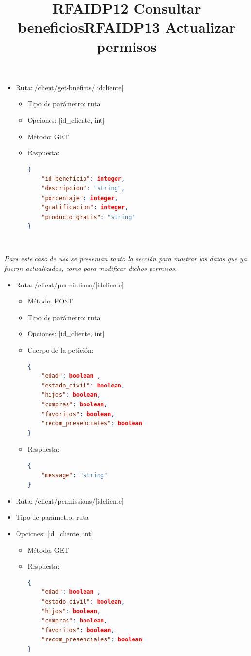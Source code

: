 \title{\textbf{RFAIDP12 Consultar beneficios}}
\begin{itemize}
\item Ruta: /client/get-bneficts/[idcliente]
\begin{itemize}
\item Tipo de parámetro: ruta
\item Opciones: [id\_cliente, int]
\item Método: GET
\item Respuesta:
\begin{lstlisting}[language=json,firstnumber=1]
{
	"id_beneficio": integer, 
	"descripcion": "string",
	"porcentaje": integer,
	"gratificacion": integer,
	"producto_gratis": "string"
}
\end{lstlisting}
\end{itemize}
\end{itemize}
\title{\textbf{RFAIDP13 Actualizar permisos}}
\\ \par
\textit{Para este caso de uso se presentan tanto la sección para mostrar los datos que ya fueron actualizados, como para modificar dichos permisos.}
\begin{itemize}
\item Ruta: /client/permissions/[idcliente]
\begin{itemize}
\item Método: POST
\item Tipo de parámetro: ruta
\item Opciones: [id\_cliente, int]
\item Cuerpo de la petición:
\begin{lstlisting}[language=json,firstnumber=1]
{
	"edad": boolean ,
	"estado_civil": boolean,
	"hijos": boolean,
	"compras": boolean,
	"favoritos": boolean,
 	"recom_presenciales": boolean
}
\end{lstlisting}
\item Respuesta: 
\begin{lstlisting}[language=json,firstnumber=1]
{
    "message": "string"
}
\end{lstlisting}
\end{itemize}
\end{itemize}

\begin{itemize}
\item Ruta: /client/permissions/[idcliente]
\item Tipo de parámetro: ruta
\item Opciones: [id\_cliente, int]
\begin{itemize}
\item Método: GET
\item Respuesta: 
\begin{lstlisting}[language=json,firstnumber=1]
{
	"edad": boolean ,
	"estado_civil": boolean,
	"hijos": boolean,
	"compras": boolean,
	"favoritos": boolean,
 	"recom_presenciales": boolean
}
\end{lstlisting}
\end{itemize}
\end{itemize}

